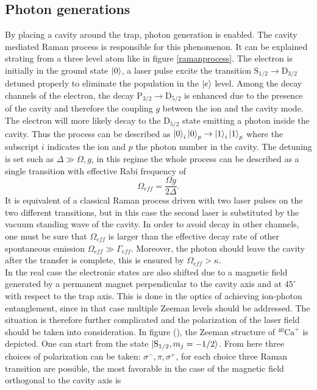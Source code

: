 \subsection{Photon generations}
By placing a cavity around the trap, photon generation is enabled. The cavity mediated Raman process is responsible for this phenomenon. It can be explained strating from a three level atom like in figure \ref{ramanprocess}. The electron is initially in the ground state $\ket{0}$, a laser pulse excite the transition $\text{S}_{1/2} \to \text{D}_{3/2}$ detuned properly to eliminate the population in the $\ket{e}$ level. Among the decay channels of the electron, the decay $\text{P}_{3/2} \to \text{D}_{5/2}$ is enhanced due to the presence of the cavity and therefore the coupling $g$ between the ion and the cavity mode. The electron will more likely decay
to the $\text{D}_{5/2}$ state emitting a photon inside the cavity. Thus the process can be described as $\ket{0}_i\ket{0}_p \to \ket{1}_i\ket{1}_p$ where the subscript $i$ indicates the ion and $p$ the photon number in the cavity. The detuning is set such as $\Delta \gg \Omega,g$, in this regime the whole process can be described as a single transition with effective Rabi frequency of \cite{helene}
\begin{equation}
\Omega_{eff} = \frac{\Omega g}{2\Delta}.
\end{equation}
It is equivalent of a classical Raman process driven with two laser pulses on the two different transitions, but in this case the second laser is substituted by the vacuum standing wave of the cavity. In order to avoid decay in other channels, one must be sure that $\Omega_{eff}$ is larger than the effective decay rate of other spontaneous emission $\Omega_{eff}\gg \Gamma_{eff}$. Moreover, the photon should leave the cavity after the transfer is complete, this is ensured by $\Omega_{eff} >\kappa$.\\
In the real case the electronic states are also shifted due to a magnetic field generated by a permanent magnet perpendicular to the cavity axis and at $45^{\circ}$ with respect to the trap axis. This is done in the optics of achieving ion-photon entanglement, since in that case multiple Zeeman levels should be addressed. The situation is therefore further complicated and the polarization of the laser field should be taken into consideration. In figure (), the Zeeman structure of $^{40}\text{Ca}^+$ is depicted. One can start from the state $\ket{\text{S}_{1/2},m_j = -1/2}$. From here three choices of polarization can be taken: $\sigma^-,\pi,\sigma^+$, for each choice three Raman transition are possible, the most favorable in the case of the magnetic field orthogonal to the cavity axis is \cite{stuteinterface}
